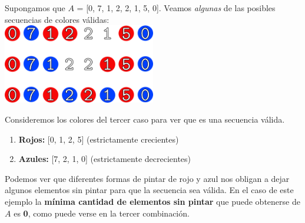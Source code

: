 Supongamos que $A$ = [0, 7, 1, 2, 2, 1, 5, 0]. Veamos \textit{algunas} de las posibles secuencias de colores válidas: \\

{\centering 
  \includegraphics[width=0.50\textwidth]{informe/img/ejemplos/ejemplo1_finalsmall.png} \\
}

\vspace{1cm}
Consideremos los colores del tercer caso para ver que es una secuencia válida.
\begin{enumerate}
\item \textcolor{rojo}{\textbf{Rojos:}} [0, 1, 2, 5]  (estrictamente crecientes)
\item \textcolor{azul}{\textbf{Azules:}} [7, 2, 1, 0]  (estrictamente decrecientes)
\end{enumerate}

Podemos ver que diferentes formas de pintar de rojo y azul nos obligan a dejar algunos elementos sin pintar para que la secuencia sea válida. En el caso de este ejemplo la \textbf{mínima cantidad de elementos sin pintar} que puede obtenerse de $A$ es \textbf{0}, como puede verse en la tercer combinación. \\
